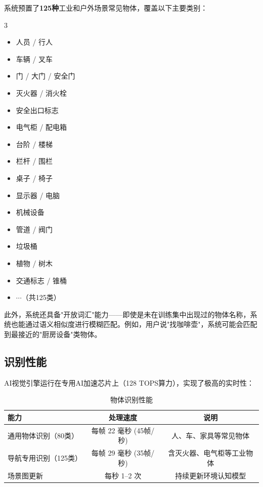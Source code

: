 \documentclass[a4paper, 12pt, openany]{book}
\begin{document}
系统预置了\textbf{125种}工业和户外场景常见物体，覆盖以下主要类别：

\begin{multicols}{3}
\begin{itemize}[leftmargin=1.5em, itemsep=1pt, parsep=0pt]
  \item 人员 / 行人
  \item 车辆 / 叉车
  \item 门 / 大门 / 安全门
  \item 灭火器 / 消火栓
  \item 安全出口标志
  \item 电气柜 / 配电箱
  \item 台阶 / 楼梯
  \item 栏杆 / 围栏
  \item 桌子 / 椅子
  \item 显示器 / 电脑
  \item 机械设备
  \item 管道 / 阀门
  \item 垃圾桶
  \item 植物 / 树木
  \item 交通标志 / 锥桶
  \item $\cdots$（共125类）
\end{itemize}
\end{multicols}

此外，系统还具备"开放词汇"能力——即使是未在训练集中出现过的物体名称，系统也能通过语义相似度进行模糊匹配。例如，用户说"找咖啡壶"，系统可能会匹配到最接近的"厨房设备"类物体。

\subsection{识别性能}

AI视觉引擎运行在专用AI加速芯片上（128 TOPS算力），实现了极高的实时性：

\begin{table}[!htb]
\centering
\renewcommand{\arraystretch}{1.4}
\begin{tabularx}{\textwidth}{X c c}
  \toprule
  \textbf{能力} & \textbf{处理速度} & \textbf{说明} \\
  \midrule
  通用物体识别（80类） & 每帧 22 毫秒 (45帧/秒) & 人、车、家具等常见物体 \\
  导航专用识别（125类） & 每帧 29 毫秒 (35帧/秒) & 含灭火器、电气柜等工业物体 \\
  场景图更新 & 每秒 1--2 次 & 持续更新环境认知模型 \\
  \bottomrule
\end{tabularx}
\caption{物体识别性能}
\end{table}
\end{document}
